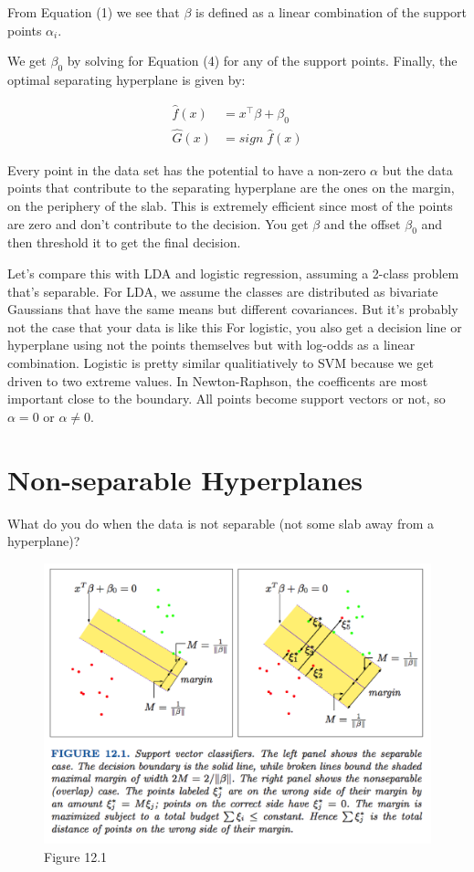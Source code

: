 \documentclass[a4paper]{article}
\begin{document}
From Equation (1) we see that $\beta$ is defined as a linear combination of the support points $\alpha_i$.

We get $\beta_0$ by solving for Equation (4) for any of the support points.  Finally, the optimal separating hyperplane is given by:

\begin{align*}
\hat{f}(x) &= x^\top \beta + \beta_0 \\
\hat{G}(x) &= sign \; \hat{f}(x)
\end{align*}

Every point in the data set has the potential to have a non-zero $\alpha$ but the data points that contribute to the separating hyperplane are the ones on the margin, on the periphery of the slab.  This is extremely efficient since most of the points are zero and don't contribute to the decision.  You get $\beta$ and the offset $\beta_0$ and then threshold it to get the final decision.

Let's compare this with LDA and logistic regression, assuming a 2-class problem that's separable.  For LDA, we assume the classes are distributed as bivariate Gaussians that have the same means but different covariances.  But it's probably not the case that your data is like this  For logistic, you also get a decision line or hyperplane using not the points themselves but with log-odds as a linear combination.  Logistic is pretty similar qualitiatively to SVM because we get driven to two extreme values.  In Newton-Raphson, the coefficents are most important close to the boundary.  All points become support vectors or not, so $\alpha=0$ or $\alpha \neq 0$.

\section{Non-separable Hyperplanes}

What do you do when the data is not separable (not some slab away from a hyperplane)?

\begin{figure}
\centering
\includegraphics[width=1.0\textwidth]{fig12_1.png}
\caption{\label{fig:svm2}Figure 12.1}
\end{figure}
\end{document}
